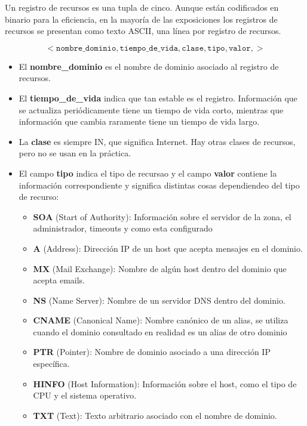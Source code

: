 Un registro de recursos es una tupla de cinco. Aunque están codificados en binario para la eficiencia, en la mayoría de las exposiciones los registros de recursos se presentan como texto ASCII, una línea por registro de recursos.

\[< \texttt{nombre\_dominio}, \texttt{tiempo\_de\_vida}, \texttt{clase}, \texttt{tipo}, \texttt{valor},>\]

\begin{itemize}
  \item El \textbf{nombre\_dominio} es el nombre de dominio asociado al registro de recursos.
  \item El \textbf{tiempo\_de\_vida} indica que tan estable es el registro. Información que se actualiza periódicamente tiene un tiempo de vida corto, mientras que información que cambia raramente tiene un tiempo de vida largo.
  \item La \textbf{clase} es siempre IN, que significa Internet. Hay otras clases de recursos, pero no se usan en la práctica.
  \item El campo \textbf{tipo} indica el tipo de recursao y el campo \textbf{valor} contiene la información correspondiente y significa distintas cosas dependiendeo del tipo de recurso:
  \begin{itemize}
    \item \textbf{SOA} (Start of Authority): Información sobre el servidor de la zona, el administrador, timeouts y como esta configurado
    \item \textbf{A} (Address): Dirección IP de un host que acepta mensajes en el dominio.
    \item \textbf{MX} (Mail Exchange): Nombre de algún host dentro del dominio que acepta emails.
    \item \textbf{NS} (Name Server): Nombre de un servidor DNS dentro del dominio.
    \item \textbf{CNAME} (Canonical Name): Nombre canónico de un alias, se utiliza cuando el dominio consultado en realidad es un alias de otro dominio
    \item \textbf{PTR} (Pointer): Nombre de dominio asociado a una dirección IP específica.
    \item \textbf{HINFO} (Host Information): Información sobre el host, como el tipo de CPU y el sistema operativo.
    \item \textbf{TXT} (Text): Texto arbitrario asociado con el nombre de dominio.
  \end{itemize}
\end{itemize}


